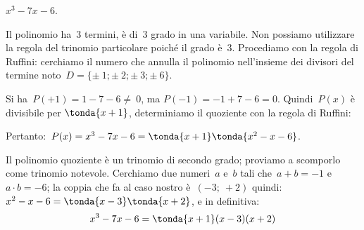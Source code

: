  \begin{esempio}
 \(x^3-7x-6\).

Il polinomio ha~3 termini, è di~3{\textdegree} grado in una variabile.
Non possiamo utilizzare la regola del trinomio particolare poiché il
grado è~3. Procediamo con la regola di Ruffini: cerchiamo il numero che annulla 
il polinomio nell'insieme dei divisori del termine
noto~\(D=\{\pm~1;\pm~2;\pm~3;\pm~6\}\).

\begin{multicols}{2}
 Si ha~\(P(+1)=1-7-6\neq~0\), ma \(P(-1)=-1+7-6=0\).
Quindi~\(P(x)\) è divisibile per \(\tonda{x+1}\), determiniamo 
il quoziente con la regola di Ruffini:

%  
\begin{inaccessibleblock}
% 
\scompruffinie
\end{inaccessibleblock}

\end{multicols}

Pertanto:~\(P(x)=x^3-7x-6=\tonda{x+1} \tonda{x^2-x-6}\).

Il polinomio quoziente è un trinomio di secondo grado; proviamo a
scomporlo come trinomio notevole.
Cerchiamo due numeri~\(a\) e~\(b\) tali che~\(a+b=-1\) e~\(a\cdot b=-6\); 
la coppia che fa al caso nostro è~\((-3;~+2)\) quindi: 
\(x^2-x-6 = \tonda{x-3} \tonda{x+2}\), e in definitiva:
\[x^{{3}}-7x-6 = \tonda{x+1} (x-3) (x+2)\]

 \end{esempio}
%  
% 
% 
% 
